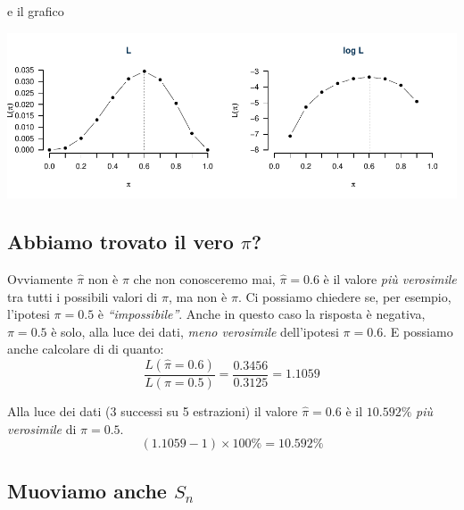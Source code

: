 \documentclass[
  11pt,
]{book}
\theoremstyle{mytheoremstyle}
\theoremstyle{mydefstyle}
\begin{document}
e il grafico

\begin{center}\includegraphics{Appunti_di_Statistica_2025_files/figure-latex/12-Verosimiglianza-9-1} \end{center}

\subsection{\texorpdfstring{Abbiamo trovato il vero \(\pi\)?}{Abbiamo trovato il vero \textbackslash pi?}}\label{abbiamo-trovato-il-vero-pi}

Ovviamente \(\hat\pi\) non è \(\pi\) che non conosceremo mai, \(\hat\pi=0.6\) è il valore \emph{più verosimile} tra tutti i possibili valori di \(\pi\), ma non è \(\pi\).
Ci possiamo chiedere se, per esempio, l'ipotesi \(\pi=0.5\) è \emph{``impossibile''}.
Anche in questo caso la risposta è negativa, \(\pi=0.5\) è solo, alla luce dei dati, \emph{meno verosimile} dell'ipotesi \(\pi=0.6\). E possiamo anche calcolare di di quanto:
\[\frac{L(\hat\pi=0.6)}{L(\pi=0.5)}=\frac{0.3456}{0.3125}=1.1059\]

Alla luce dei dati (3 successi su 5 estrazioni) il valore \(\hat\pi=0.6\) è il \(10.592\%\) \emph{più verosimile} di \(\pi=0.5\).
\[
  (1.1059-1)\times 100 \%= 10.592\%
\]

\subsection{\texorpdfstring{Muoviamo anche \(S_n\)}{Muoviamo anche S\_n}}\label{muoviamo-anche-s_n}
\end{document}
